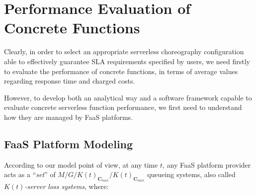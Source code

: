 \documentclass[12pt,a4paper]{report}
\begin{document}
\section{Performance Evaluation of Concrete Functions}

Clearly, in order to select an appropriate serverless choreography configuration able to effectively guarantee SLA requirements specified by users, we need firstly to evaluate the performance of concrete functions, in terms of average values regarding response time and charged costs.

However, to develop both an analytical way and a software framework capable to evaluate concrete serverless function performance, we first need to understand how they are managed by FaaS platforms.

\subsection{FaaS Platform Modeling}

According to our model point of view, at any time $t$, any FaaS platform provider acts as a ``\textit{set}'' of $M/G/K(t)_{\textbf{C}_{max}}/K(t)_{\textbf{C}_{max}}$ queueing systems, also called \textit{$K(t)$-server loss systems}, where:
\end{document}
